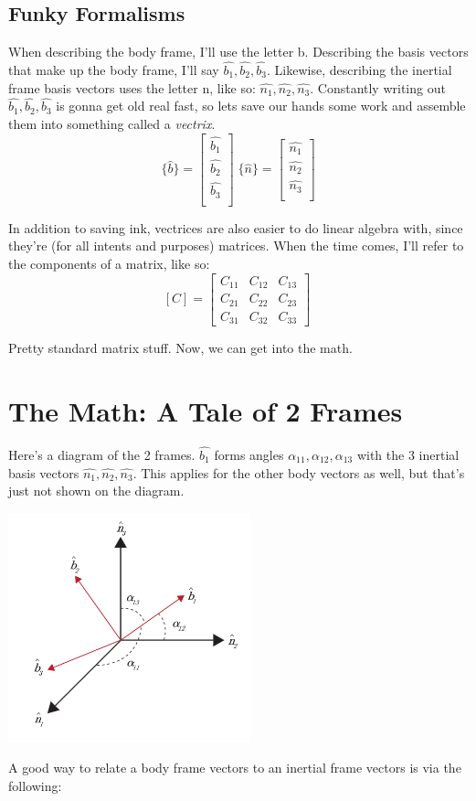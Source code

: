 \documentclass[a4paper,14pt]{extreport}
\newcommand{\bv}[1]{\hat{b_{#1}}}
\newcommand{\nv}[1]{\hat{n_{#1}}}
\begin{document}
\subsection{Funky Formalisms}
When describing the body frame, I'll use the letter b. Describing the basis vectors that make up the body frame, I'll say $\bv{1}, \bv{2}, \bv{3}$. Likewise, describing the inertial frame basis vectors uses the letter n, like so: $\nv{1}, \nv{2}, \nv{3}$. Constantly writing out $\bv{1}, \bv{2}, \bv{3}$ is gonna get old real fast, so lets save our hands some work and assemble them into something called a \emph{vectrix}.
\[
\{\hat{b}\} = 
\begin{bmatrix}
\bv{1}\\ \bv{2}\\ \bv{3}\\
\end{bmatrix}\;
\{\hat{n}\} = 
\begin{bmatrix}
\nv{1}\\ \nv{2}\\ \nv{3}\\
\end{bmatrix}
\] 

In addition to saving ink, vectrices are also easier to do linear algebra with, since they're (for all intents and purposes) matrices. When the time comes, I'll refer to the components of a matrix, like so:
\[
[C] = \begin{bmatrix}
C_{11}&C_{12}&C_{13}\\
C_{21}&C_{22}&C_{23}\\
C_{31}&C_{32}&C_{33}
\end{bmatrix}\
\]

Pretty standard matrix stuff. Now, we can get into the math.
\section{The Math: A Tale of 2 Frames}
Here's a diagram of the 2 frames. $\bv{1}$ forms angles $\alpha_{11}, \alpha_{12}, \alpha_{13}$ with the 3 inertial basis vectors $\nv{1},\nv{2},\nv{3}$. This applies for the other body vectors as well, but that's just not shown on the diagram.
\begin{center}
\includegraphics[width=7cm]{dcmalpha}
\end{center}
A good way to relate a body frame vectors to an inertial frame vectors is via the following:
\end{document}
